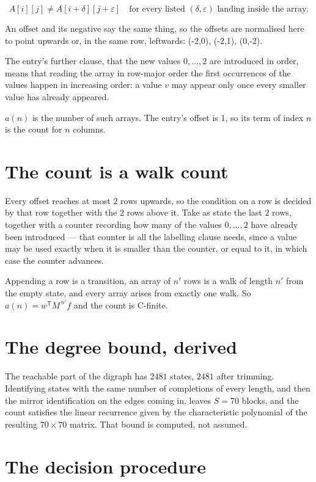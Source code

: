 \documentclass[11pt]{article}
\theoremstyle{definition}
\begin{document}
\[A[i][j] \ne A[i{+}\delta][j{+}\varepsilon]\quad\text{for every listed }(\delta,\varepsilon)\text{ landing inside the array.}\]

An offset and its negative say the same thing, so the offsets are normalised here to point upwards or, in the same row, leftwards: (-2,0), (-2,1), (0,-2).

The entry's further clause, that the new values $0,\dots,2$ are introduced in order, means that reading the array in row-major order the first occurrences of the values happen in increasing order: a value $v$ may appear only once every smaller value has already appeared.

$a(n)$ is the number of such arrays. The entry's offset is 1, so its term of index $n$ is the count for $n$ columns.

\section{The count is a walk count}

Every offset reaches at most $2$ rows upwards, so the condition on a row is decided by that row together with the $2$ rows above it. Take as state the last $2$ rows, together with a counter recording how many of the values $0,\dots,2$ have already been introduced --- that counter is all the labelling clause needs, since a value may be used exactly when it is smaller than the counter, or equal to it, in which case the counter advances.

Appending a row is a transition, an array of $n'$ rows is a walk of length $n'$ from the empty state, and every array arises from exactly one walk. So $a(n) = w^{\mathsf T}M^{\,n'}f$ and the count is C-finite.

\section{The degree bound, derived}

The reachable part of the digraph has $2481$ states, $2481$ after trimming. Identifying states with the same number of completions of every length, and then the mirror identification on the edges coming in, leaves $S = 70$ blocks, and the count satisfies the linear recurrence given by the characteristic polynomial of the resulting $70\times70$ matrix. That bound is computed, not assumed.

\section{The decision procedure}
\end{document}
